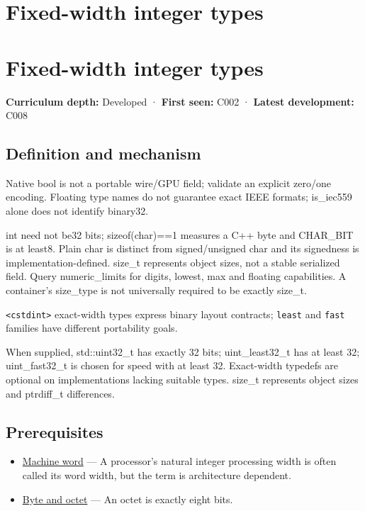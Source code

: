 \hypertarget{appendix-cc04044b5782}{}
\section*{Fixed-width integer types}
\section{Fixed-width integer types}\label{fixed-width-integer-types}

\textbf{Curriculum depth:} Developed · \textbf{First seen:} C002 · \textbf{Latest development:} C008

\subsection{Definition and mechanism}\label{definition-and-mechanism}

Native bool is not a portable wire/GPU field; validate an explicit zero/one encoding. Floating type names do not guarantee exact IEEE formats; is\_iec559 alone does not identify binary32.

int need not be32 bits; sizeof(char)==1 measures a C++ byte and CHAR\_BIT is at least8. Plain char is distinct from signed/unsigned char and its signedness is implementation-defined. size\_t represents object sizes, not a stable serialized field. Query numeric\_limits for digits, lowest, max and floating capabilities. A container's size\_type is not universally required to be exactly size\_t.

\texttt{\textless{}cstdint\textgreater{}} exact-width types express binary layout contracts; \texttt{least} and \texttt{fast} families have different portability goals.

When supplied, std::uint32\_t has exactly 32 bits; uint\_least32\_t has at least 32; uint\_fast32\_t is chosen for speed with at least 32. Exact-width typedefs are optional on implementations lacking suitable types. size\_t represents object sizes and ptrdiff\_t differences.

\subsection{Prerequisites}\label{prerequisites}

\begin{itemize}
\tightlist
\item
  \hyperref[appendix-d67a19507dc5]{Machine word} --- A processor's natural integer processing width is often called its word width, but the term is architecture dependent.
\item
  \hyperref[appendix-5bee2df85484]{Byte and octet} --- An octet is exactly eight bits.
\end{itemize}

